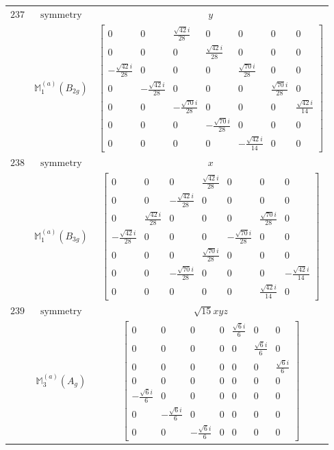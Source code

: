 \documentclass[fleqn,8pt,landscape]{jsarticle}
\begin{document}
\begin{longtable}{ccc}
$ 237 $ & $ \text{symmetry} $ & $ y $ \\
$  $ & $ \mathbb{M}_{1}^{(a)}(B_{2g}) $ & $ \begin{bmatrix} 0 & 0 & \frac{\sqrt{42} i}{28} & 0 & 0 & 0 & 0 \\ 0 & 0 & 0 & \frac{\sqrt{42} i}{28} & 0 & 0 & 0 \\ - \frac{\sqrt{42} i}{28} & 0 & 0 & 0 & \frac{\sqrt{70} i}{28} & 0 & 0 \\ 0 & - \frac{\sqrt{42} i}{28} & 0 & 0 & 0 & \frac{\sqrt{70} i}{28} & 0 \\ 0 & 0 & - \frac{\sqrt{70} i}{28} & 0 & 0 & 0 & \frac{\sqrt{42} i}{14} \\ 0 & 0 & 0 & - \frac{\sqrt{70} i}{28} & 0 & 0 & 0 \\ 0 & 0 & 0 & 0 & - \frac{\sqrt{42} i}{14} & 0 & 0 \end{bmatrix} $ \\ \hline
$ 238 $ & $ \text{symmetry} $ & $ x $ \\
$  $ & $ \mathbb{M}_{1}^{(a)}(B_{3g}) $ & $ \begin{bmatrix} 0 & 0 & 0 & \frac{\sqrt{42} i}{28} & 0 & 0 & 0 \\ 0 & 0 & - \frac{\sqrt{42} i}{28} & 0 & 0 & 0 & 0 \\ 0 & \frac{\sqrt{42} i}{28} & 0 & 0 & 0 & \frac{\sqrt{70} i}{28} & 0 \\ - \frac{\sqrt{42} i}{28} & 0 & 0 & 0 & - \frac{\sqrt{70} i}{28} & 0 & 0 \\ 0 & 0 & 0 & \frac{\sqrt{70} i}{28} & 0 & 0 & 0 \\ 0 & 0 & - \frac{\sqrt{70} i}{28} & 0 & 0 & 0 & - \frac{\sqrt{42} i}{14} \\ 0 & 0 & 0 & 0 & 0 & \frac{\sqrt{42} i}{14} & 0 \end{bmatrix} $ \\ \hline
$ 239 $ & $ \text{symmetry} $ & $ \sqrt{15} x y z $ \\
$  $ & $ \mathbb{M}_{3}^{(a)}(A_{g}) $ & $ \begin{bmatrix} 0 & 0 & 0 & 0 & \frac{\sqrt{6} i}{6} & 0 & 0 \\ 0 & 0 & 0 & 0 & 0 & \frac{\sqrt{6} i}{6} & 0 \\ 0 & 0 & 0 & 0 & 0 & 0 & \frac{\sqrt{6} i}{6} \\ 0 & 0 & 0 & 0 & 0 & 0 & 0 \\ - \frac{\sqrt{6} i}{6} & 0 & 0 & 0 & 0 & 0 & 0 \\ 0 & - \frac{\sqrt{6} i}{6} & 0 & 0 & 0 & 0 & 0 \\ 0 & 0 & - \frac{\sqrt{6} i}{6} & 0 & 0 & 0 & 0 \end{bmatrix} $ \\ \hline

\end{longtable}
\end{document}
